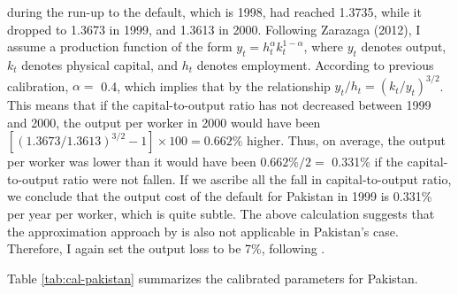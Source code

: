 \begin{enumerate}[label = (\roman*)]
    during the run-up to the default, which is 1998, had reached 1.3735, while it dropped to 1.3673 in 1999, and 1.3613 in 2000. Following Zarazaga (2012), I assume a production function of the form $y_t = h_t^\alpha k_t^{1-\alpha}$, where $y_t$ denotes output, $k_t$ denotes physical capital, and $h_t$ denotes employment. According to previous calibration, $\alpha=$ 0.4, which implies that by the relationship ${y_t}/{h_t} = \left( {k_t}/{y_t} \right)^{3/2}$. This means that if the capital-to-output ratio has not decreased between 1999 and 2000, the output per worker in 2000 would have been $[(1.3673 /1.3613)^{3/2} - 1] \times 100 = 0.662\%$ higher. Thus, on average, the output per worker was lower than it would have been $0.662\%/2=$ 0.331\% if the capital-to-output ratio were not fallen. If we ascribe all the fall in capital-to-output ratio, we conclude that the output cost of the default for Pakistan in 1999 is 0.331\% per year per worker, which is quite subtle. The above calculation suggests that the approximation approach by \citet{zarazaga-12} is also not applicable in Pakistan's case.
    Therefore, I again set the output loss to be 7\%, following \citet{Na-18}.
\end{enumerate}
Table \ref{tab:cal-pakistan} summarizes the calibrated parameters for Pakistan.
